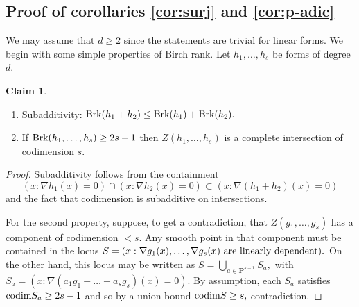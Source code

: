 \documentclass[12pt]{amsart}
\theoremstyle{definition}
\newtheorem{claim}[theorem]{Claim}
\renewcommand{\P}{\mathbf{P}}
\newcommand{\codim}{\textnormal{codim}}
\newcommand{\brk}{\textnormal{Brk}}
\begin{document}
\subsection{Proof of corollaries \ref{cor:surj} and  \ref{cor:p-adic}}

We may assume that $d\ge 2$ since the statements are trivial for linear forms. We begin with some simple properties of Birch rank. Let $h_1,\ldots,h_s$ be forms of degree $d.$

\begin{claim}\label{brk-basic}\mbox{}
\begin{enumerate}
    \item Subadditivity:
    $\brk(h_1+h_2) \le \brk(h_1)+\brk(h_2).$
    \item If $\brk(h_1,\ldots,h_s) \ge 2s-1$ then $Z(h_1,\ldots,h_s)$ is a complete intersection of codimension $s.$
\end{enumerate}
    
\end{claim}

\begin{proof}
    Subadditivity follows from the containment 
    \[
    (x:\nabla h_1(x) = 0) \cap (x:\nabla h_2(x) = 0) \subset (x:\nabla (h_1+h_2)(x) = 0)
    \]
    and the fact that codimension is subadditive on intersections. 

    For the second property, suppose, to get a contradiction, that $Z(g_1,\ldots,g_s)$ has a component of codimension $<s.$ Any smooth point in that component must be contained in the locus $S = (x: \nabla g_1(x),\ldots,\nabla g_s(x) \textnormal{ are linearly dependent}).$ On the other hand, this locus may be written as $S = \bigcup_{a\in \P^{s-1}} S_a,$ with $ S_a =  (x: \nabla (a_1g_1+\ldots+a_sg_s)(x) = 0).$ By assumption, each $S_a$ satisfies $\codim S_a \ge 2s-1$ and so by a union bound $\codim S \ge s,$ contradiction.
\end{proof}
\end{document}
